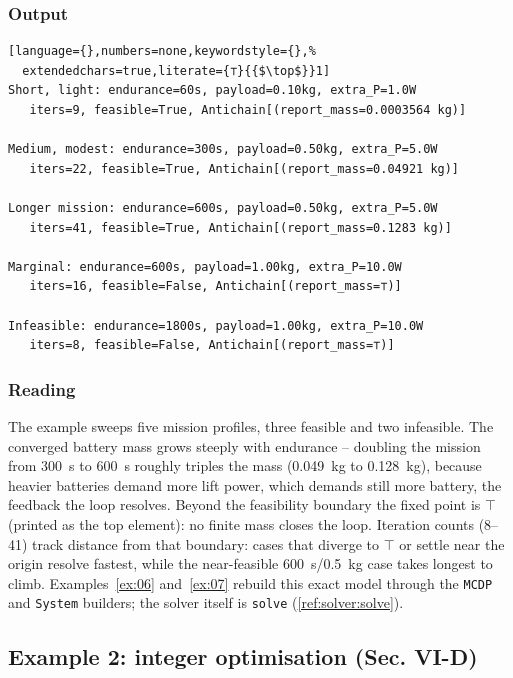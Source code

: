 \documentclass[11pt,a4paper]{article}
\newcommand{\topp}{\top}
\begin{document}
\subsubsection*{Output}

\begin{lstlisting}[language={},numbers=none,keywordstyle={},%
  extendedchars=true,literate={⊤}{{$\top$}}1]
Short, light: endurance=60s, payload=0.10kg, extra_P=1.0W
   iters=9, feasible=True, Antichain[(report_mass=0.0003564 kg)]

Medium, modest: endurance=300s, payload=0.50kg, extra_P=5.0W
   iters=22, feasible=True, Antichain[(report_mass=0.04921 kg)]

Longer mission: endurance=600s, payload=0.50kg, extra_P=5.0W
   iters=41, feasible=True, Antichain[(report_mass=0.1283 kg)]

Marginal: endurance=600s, payload=1.00kg, extra_P=10.0W
   iters=16, feasible=False, Antichain[(report_mass=⊤)]

Infeasible: endurance=1800s, payload=1.00kg, extra_P=10.0W
   iters=8, feasible=False, Antichain[(report_mass=⊤)]
\end{lstlisting}

\subsubsection*{Reading}

The example sweeps five mission profiles, three feasible and two
infeasible. The converged battery mass grows steeply with endurance --
doubling the mission from 300~s to 600~s roughly triples the mass
(0.049~kg to 0.128~kg), because heavier batteries demand more lift power,
which demands still more battery, the feedback the loop resolves. Beyond
the feasibility boundary the fixed point is $\topp$ (printed as the top
element): no finite mass closes the loop. Iteration counts (8--41) track
distance from that boundary: cases that diverge to $\topp$ or settle near
the origin resolve fastest, while the near-feasible 600~s/0.5~kg case
takes longest to climb. Examples~\ref{ex:06} and~\ref{ex:07} rebuild this
exact model through the \texttt{MCDP} and \texttt{System} builders; the
solver itself is \texttt{solve} (\ref{ref:solver:solve}).

\subsection{Example 2: integer optimisation (Sec. VI-D)}\label{ex:02}
\end{document}
